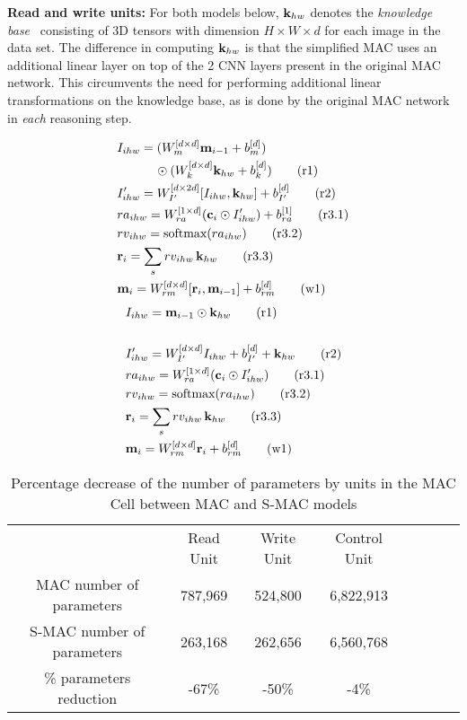 \noindent\textbf{Read and write units:}
For both models below, $\mathbf{k}_{hw}$ denotes the 
\emph{knowledge base}~\cite{hudson2018compositional}
consisting of 3D tensors with dimension $H \times W \times d$ for each image
in the data set. The difference in computing $\mathbf{k}_{hw}$ is that the simplified MAC uses
an additional linear layer on top of the 2 CNN layers present in the original MAC network.
This circumvents the need for performing additional linear transformations on the 
knowledge base, as is done by the original MAC network in \emph{each} reasoning step.

\begin{multicols}{2}
	\noindent
	\begin{align*}
	&I_{ihw} = (W_{m}^{[d \times d]} \mathbf{m}_{i-1} + b_{m}^{[d]}) \\
	           & \qquad \quad \odot (W_{k}^{[d \times d]} \mathbf{k}_{hw} + b_{k}^{[d]}) \tag{r1} \\
	&I'_{ihw} =  W_{I'}^{[d \times 2d]} [I_{ihw},\mathbf{k}_{hw}]  + b_{I'}^{[d]}  \tag{r2} \\
	&ra_{ihw} = W_{ra}^{[1 \times d]} (\mathbf{c}_i \odot I'_{ihw}) + b_{ra}^{[1]} \tag{r3.1}\\
	&rv_{ihw} = \textrm{softmax}(ra_{ihw}) \tag{r3.2}\\
	&\mathbf{r}_i = \sum_s rv_{ihw} \, \mathbf{k}_{hw}  \tag{r3.3}\\
	&\mathbf{m}_i = W_{rm}^{[d \times d]} [\mathbf{r}_i, \mathbf{m}_{i-1}]  + b_{rm}^{[d]} \tag{w1}	
	\end{align*}
	\columnbreak
	{\color{Plum}
	\begin{align*}
	&I_{ihw} = \mathbf{m}_{i-1} \odot \mathbf{k}_{hw} \tag{r1} \\ \\
	&I'_{ihw} = W_{I'}^{[d \times d]} I_{ihw} + b_{I'}^{[d]} + \mathbf{k}_{hw} \tag{r2} \\
	&ra_{ihw} = W_{ra}^{[1 \times d]} (\mathbf{c}_i \odot I'_{ihw})  \tag{r3.1}\\
	&rv_{ihw} = \textrm{softmax}(ra_{ihw}) \tag{r3.2}\\
	&\mathbf{r}_i = \sum_s rv_{ihw} \, \mathbf{k}_{hw}  \tag{r3.3}\\
	&\mathbf{m}_i = W_{rm}^{[d \times d]} \mathbf{r}_i + b_{rm}^{[d]} \tag{w1}
	\end{align*}}
\end{multicols}

\begin{table}[]
	\caption{Percentage decrease of the number of parameters by units in the MAC Cell between MAC and S-MAC models}
	\centering
	\begin{tabular}{ccccCcCc}
		\toprule
	             & Read Unit               & Write Unit &  Control Unit         \\
		   
		MAC number of parameters  &  787,969 &  524,800        &    6,822,913    \\
		  
	    S-MAC number of parameters  & 263,168  & 262,656       &    6,560,768 \\
	      
	     \% parameters reduction  & -67\%  &   -50\%       &      -4\%  \\
		\bottomrule
	\end{tabular}
	\label{results}
\end{table}